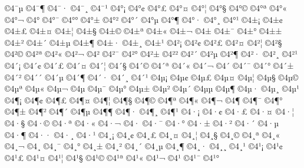 {^^a94^^af^^b5
^^a94^^af^^b6
^^a94^^af^^b7
^^a94^^af^^b8
^^a94^^af^^b9
^^a94^^b0^^a1
^^a94^^b0^^a2
^^a94^^b0^^a3
^^a94^^b0^^a4
^^a94^^b0^^a6
^^a94^^b0^^a7
^^a94^^b0^^a9
^^a94^^b0^^aa
^^a94^^b0^^ab
^^a94^^b0^^ac
^^a94^^b0^^ad
^^a94^^b0^^af
^^a94^^b0^^b0
^^a94^^b0^^b1
^^a94^^b0^^b2
^^a94^^b0^^b4
^^a94^^b0^^b5
^^a94^^b0^^b6
^^a94^^b0^^b7
^^a94^^b0^^b8
^^a94^^b0^^b9
^^a94^^b1^^a1
^^a94^^b1^^a2
^^a94^^b1^^a3
^^a94^^b1^^a4
^^a94^^b1^^a6
^^a94^^b1^^a7
^^a94^^b1^^a9
^^a94^^b1^^aa
^^a94^^b1^^ab
^^a94^^b1^^ac
^^a94^^b1^^ad
^^a94^^b1^^af
^^a94^^b1^^b0
^^a94^^b1^^b1
^^a94^^b1^^b2
^^a94^^b1^^b4
^^a94^^b1^^b5
^^a94^^b1^^b6
^^a94^^b1^^b7
^^a94^^b1^^b8
^^a94^^b1^^b9
^^a94^^b2^^a1
^^a94^^b2^^a2
^^a94^^b2^^a3
^^a94^^b2^^a4
^^a94^^b2^^a6
^^a94^^b2^^a7
^^a94^^b2^^a9
^^a94^^b2^^aa
^^a94^^b2^^ab
^^a94^^b2^^ac
^^a94^^b2^^ad
^^a94^^b2^^af
^^a94^^b2^^b0
^^a94^^b2^^b1
^^a94^^b2^^b2
^^a94^^b2^^b4
^^a94^^b2^^b5
^^a94^^b2^^b6
^^a94^^b2^^b7
^^a94^^b2^^b8
^^a94^^b2^^b9
^^a94^^b4^^a1
^^a94^^b4^^a2
^^a94^^b4^^a3
^^a94^^b4^^a4
^^a94^^b4^^a6
^^a94^^b4^^a7
^^a94^^b4^^a9
^^a94^^b4^^aa
^^a94^^b4^^ab
^^a94^^b4^^ac
^^a94^^b4^^ad
^^a94^^b4^^af
^^a94^^b4^^b0
^^a94^^b4^^b1
^^a94^^b4^^b2
^^a94^^b4^^b4
^^a94^^b4^^b5
^^a94^^b4^^b6
^^a94^^b4^^b7
^^a94^^b4^^b8
^^a94^^b4^^b9
^^a94^^b5^^a1
^^a94^^b5^^a2
^^a94^^b5^^a3
^^a94^^b5^^a4
^^a94^^b5^^a6
^^a94^^b5^^a7
^^a94^^b5^^a9
^^a94^^b5^^aa
^^a94^^b5^^ab
^^a94^^b5^^ac
^^a94^^b5^^ad
^^a94^^b5^^af
^^a94^^b5^^b0
^^a94^^b5^^b1
^^a94^^b5^^b2
^^a94^^b5^^b4
^^a94^^b5^^b5
^^a94^^b5^^b6
^^a94^^b5^^b7
^^a94^^b5^^b8
^^a94^^b5^^b9
^^a94^^b6^^a1
^^a94^^b6^^a2
^^a94^^b6^^a3
^^a94^^b6^^a4
^^a94^^b6^^a6
^^a94^^b6^^a7
^^a94^^b6^^a9
^^a94^^b6^^aa
^^a94^^b6^^ab
^^a94^^b6^^ac
^^a94^^b6^^ad
^^a94^^b6^^af
^^a94^^b6^^b0
^^a94^^b6^^b1
^^a94^^b6^^b2
^^a94^^b6^^b4
^^a94^^b6^^b5
^^a94^^b6^^b6
^^a94^^b6^^b7
^^a94^^b6^^b8
^^a94^^b6^^b9
^^a94^^b7^^a1
^^a94^^b7^^a2
^^a94^^b7^^a3
^^a94^^b7^^a4
^^a94^^b7^^a6
^^a94^^b7^^a7
^^a94^^b7^^a9
^^a94^^b7^^aa
^^a94^^b7^^ab
^^a94^^b7^^ac
^^a94^^b7^^ad
^^a94^^b7^^af
^^a94^^b7^^b0
^^a94^^b7^^b1
^^a94^^b7^^b2
^^a94^^b7^^b4
^^a94^^b7^^b5
^^a94^^b7^^b6
^^a94^^b7^^b7
^^a94^^b7^^b8
^^a94^^b7^^b9
^^a94^^b8^^a1
^^a94^^b8^^a2
^^a94^^b8^^a3
^^a94^^b8^^a4
^^a94^^b8^^a6
^^a94^^b8^^a7
^^a94^^b8^^a9
^^a94^^b8^^aa
^^a94^^b8^^ab
^^a94^^b8^^ac
^^a94^^b8^^ad
^^a94^^b8^^af
^^a94^^b8^^b0
^^a94^^b8^^b1
^^a94^^b8^^b2
^^a94^^b8^^b4
^^a94^^b8^^b5
^^a94^^b8^^b6
^^a94^^b8^^b7
^^a94^^b8^^b8
^^a94^^b8^^b9
^^a94^^b9^^a1
^^a94^^b9^^a2
^^a94^^b9^^a3
^^a94^^b9^^a4
^^a94^^b9^^a6
^^a94^^b9^^a7
^^a94^^b9^^a9
^^a94^^b9^^aa
^^a94^^b9^^ab
^^a94^^b9^^ac
^^a94^^b9^^ad
^^a94^^b9^^af
^^a94^^b9^^b0
}
